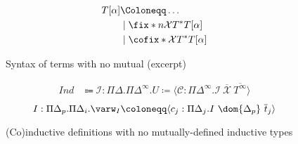 \begin{figure}
\centering
\begin{align*}
T[\alpha] &\Coloneqq \dots \\
    &\mid \fix*{n}{\mathcal{X}}{T^*}{T[\alpha]} \\
    &\mid \cofix*{}{\mathcal{X}}{T^*}{T[\alpha]}
\end{align*}
\caption{Syntax of \lang terms with no mutual \cofixpoints (excerpt)}
\label{fig:simpl-terms}
\end{figure}

\begin{figure}
\centering
\begin{align*}
\textit{Ind} &\Coloneqq \mathcal{I}: \Pi\Delta . \Pi\Delta^\infty . U \coloneqq \langle \mathcal{C}: \Pi\Delta^\infty . \mathcal{I} ~ \overline{\mathcal{X}} ~ \overline{T^\infty} \rangle
\end{align*}
\begin{equation*}
I: \Pi\Delta_p. \Pi\Delta_i . \varw_I \coloneqq \langle c_j: \Pi\Delta_j . I ~ \dom{\Delta_p} ~ \overline{t}_j \rangle
\end{equation*}
\caption{(Co)inductive definitions with no mutually-defined inductive types}
\label{fig:simpl-inductives}
\end{figure}
